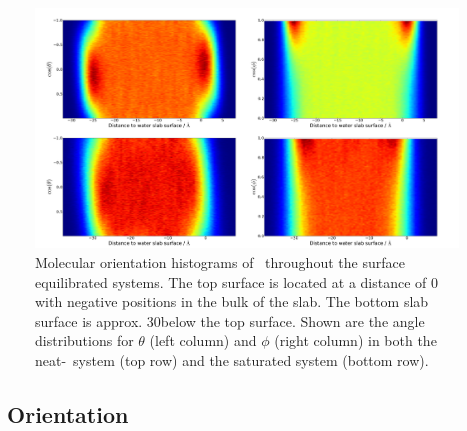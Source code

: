 \begin{figure}[h!]
	\begin{center}
		\includegraphics[scale=1.0]{images/waterorientationsmall.png}
		\caption{Molecular orientation histograms of \wat~throughout the surface equilibrated systems. The top surface is located at a distance of 0 with negative positions in the bulk of the slab. The bottom slab surface is approx. 30\angs below the top surface. Shown are the angle distributions for $\theta$ (left column) and $\phi$ (right column) in both the neat-\wat~system (top row) and the saturated system (bottom row).}
		\label{fig:water-orientation}
	\end{center}
\end{figure}

\subsection{\suldiox~Orientation}
